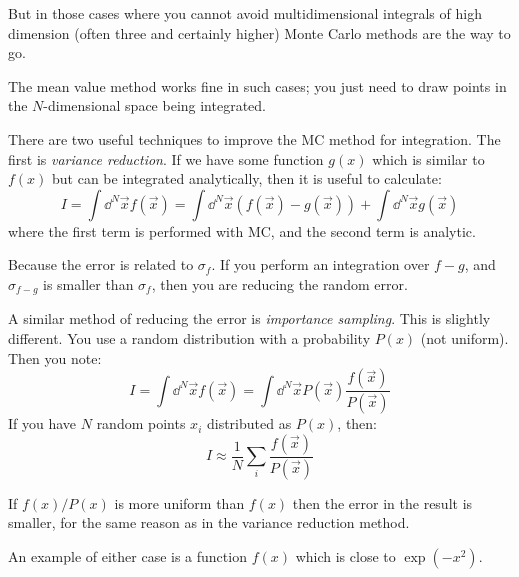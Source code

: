 But in those cases where you cannot avoid multidimensional integrals
of high dimension (often three and certainly higher) Monte Carlo
methods are the way to go.


\begin{answer}
The mean value method works fine in such cases; you just need to draw
points in the $N$-dimensional space being integrated.
\end{answer}

There are two useful techniques to improve the MC method for
integration. The first is {\it variance reduction}. If we have some
function $g(x)$ which is similar to $f(x)$ but can be integrated
analytically, then it is useful to calculate:
\begin{equation}
  I = \int \dd^N{\vec{x}} f(\vec{x})
  = \int \dd^N{\vec{x}} (f(\vec{x}) - g(\vec{x})) + 
  \int \dd^N{\vec{x}} g(\vec{x})
\end{equation}
where the first term is performed with MC, and the second term is
analytic. 


\begin{answer}
Because the error is related to $\sigma_f$. If you perform an
integration over $f-g$, and $\sigma_{f-g}$ is smaller than $\sigma_f$,
then you are reducing the random error.
\end{answer}

A similar method of reducing the error is {\it importance
  sampling}. This is slightly different. You use a random distribution
with a probability $P(x)$ (not uniform). Then you note:
\begin{equation}
  I = \int \dd^N{\vec{x}} f(\vec{x}) = 
  \int \dd^N{\vec{x}} P(\vec{x}) \frac{f(\vec{x})}{P(\vec{x})}
\end{equation}
If you have $N$ random points $x_i$ distributed as $P(x)$, then:
\begin{equation}
 I \approx \frac{1}{N} \sum_{i}  \frac{f(\vec{x})}{P(\vec{x})}
\end{equation}

If $f(x)/P(x)$  is more uniform than $f(x)$ then the error in the
result is smaller, for the same reason as in the variance reduction
method. 

An example of either case is a function $f(x)$ which is close to
$\exp(-x^2)$.

